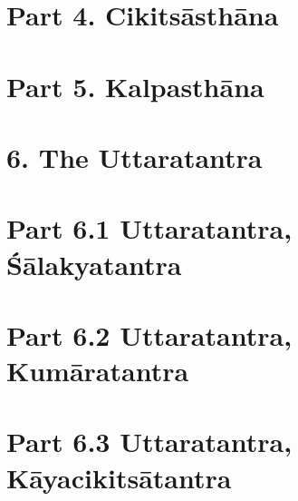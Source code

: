 \documentclass[12pt,
    ]{book}
\begin{document}
        \part{Part 4. Cikitsāsthāna}
        
        
            \thispagestyle{empty}
        
            \thispagestyle{empty}
        
            \thispagestyle{empty}
        
        \part{Part 5. Kalpasthāna}
       
        
            \thispagestyle{empty}
        
            \thispagestyle{empty}
            \thispagestyle{empty}
        
            \thispagestyle{empty}
        
            \thispagestyle{empty}      
        
            \thispagestyle{empty}
        
            \thispagestyle{empty}
        
       \thispagestyle{empty}
        
            \thispagestyle{empty}
        

\part{6. The Uttaratantra} 



        \part{Part 6.1 Uttaratantra, Śālakyatantra} %
                
        
            \thispagestyle{empty}
            
    \part{Part 6.2 Uttaratantra, Kumāratantra} %
                
     
     \part{Part 6.3 Uttaratantra, Kāyacikitsātantra} %
     
\end{document}
